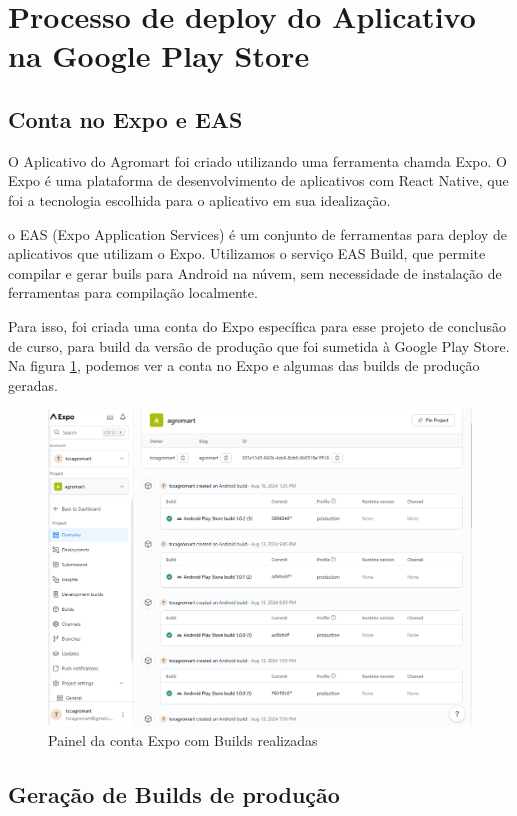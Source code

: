 \section{Processo de deploy do Aplicativo na Google Play Store}

\subsection{Conta no Expo e EAS}
O Aplicativo do Agromart foi criado utilizando uma ferramenta chamda Expo. O Expo é uma plataforma de desenvolvimento de aplicativos com React Native, que foi a tecnologia escolhida para o aplicativo em sua idealização.

o EAS (Expo Application Services) é um conjunto de ferramentas para deploy de aplicativos que utilizam o Expo. Utilizamos o serviço EAS Build, que permite compilar e gerar buils para Android na núvem, sem necessidade de instalação de ferramentas para compilação localmente.

Para isso, foi criada uma conta do Expo específica para esse projeto de conclusão de curso, para build da versão de produção que foi sumetida à Google Play Store. Na figura \ref{expo}, podemos ver a conta no Expo e algumas das builds de produção geradas.

\begin{figure}[h]
	\centering
\includegraphics[keepaspectratio=true,scale=0.35]{figuras/expo.png}
	\caption{Painel da conta Expo com Builds realizadas}
	\label{expo}
\end{figure}

\subsection{Geração de Builds de produção}


